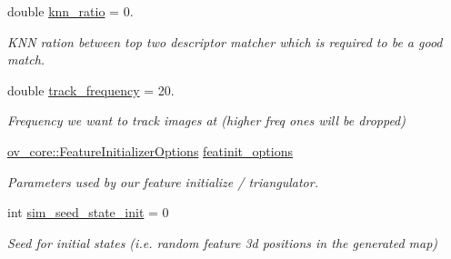 \begin{DoxyCompactItemize}
\mbox{\label{structov__msckf_1_1VioManagerOptions_a62800a75870b19213d1c44e69b2c32f7}} 
double \hyperlink{structov__msckf_1_1VioManagerOptions_a62800a75870b19213d1c44e69b2c32f7}{knn\+\_\+ratio} = 0.
\begin{DoxyCompactList}\small\item\em K\+NN ration between top two descriptor matcher which is required to be a good match. \end{DoxyCompactList}\item 
\mbox{\label{structov__msckf_1_1VioManagerOptions_a0911df8b2eb55f73191c9b0c815cb538}} 
double \hyperlink{structov__msckf_1_1VioManagerOptions_a0911df8b2eb55f73191c9b0c815cb538}{track\+\_\+frequency} = 20.
\begin{DoxyCompactList}\small\item\em Frequency we want to track images at (higher freq ones will be dropped) \end{DoxyCompactList}\item 
\mbox{\label{structov__msckf_1_1VioManagerOptions_a3ef0a31865f542c778762883c5d1bb11}} 
\hyperlink{structov__core_1_1FeatureInitializerOptions}{ov\+\_\+core\+::\+Feature\+Initializer\+Options} \hyperlink{structov__msckf_1_1VioManagerOptions_a3ef0a31865f542c778762883c5d1bb11}{featinit\+\_\+options}
\begin{DoxyCompactList}\small\item\em Parameters used by our feature initialize / triangulator. \end{DoxyCompactList}\item 
\mbox{\label{structov__msckf_1_1VioManagerOptions_a04e82ff351254354378cd7568aaef6ed}} 
int \hyperlink{structov__msckf_1_1VioManagerOptions_a04e82ff351254354378cd7568aaef6ed}{sim\+\_\+seed\+\_\+state\+\_\+init} = 0
\begin{DoxyCompactList}\small\item\em Seed for initial states (i.\+e. random feature 3d positions in the generated map) \end{DoxyCompactList}\item 
\mbox{\label{structov__msckf_1_1VioManagerOptions_afe2c433c61d25c18901b089a2215114c}} 

\end{DoxyCompactItemize}
